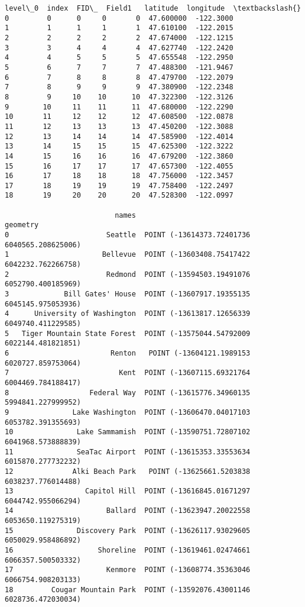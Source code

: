 \documentclass[11pt]{article}
\makeatletter
\newcommand{\boxspacing}{\kern\kvtcb@left@rule\kern\kvtcb@boxsep}
\newcommand{\prompt}[4]{
        {\ttfamily\llap{{\color{#2}[#3]:\hspace{3pt}#4}}\vspace{-\baselineskip}}
    }
\makeatother
\begin{document}
            \begin{tcolorbox}[breakable, size=fbox, boxrule=.5pt, pad at break*=1mm, opacityfill=0]
\prompt{Out}{outcolor}{161}{\boxspacing}
\begin{Verbatim}[commandchars=\\\{\}]
    level\_0  index  FID\_  Field1   latitude  longitude  \textbackslash{}
0         0      0     0       0  47.600000  -122.3000
1         1      1     1       1  47.610100  -122.2015
2         2      2     2       2  47.674000  -122.1215
3         3      4     4       4  47.627740  -122.2420
4         4      5     5       5  47.655548  -122.2950
5         6      7     7       7  47.488300  -121.9467
6         7      8     8       8  47.479700  -122.2079
7         8      9     9       9  47.380900  -122.2348
8         9     10    10      10  47.322300  -122.3126
9        10     11    11      11  47.680000  -122.2290
10       11     12    12      12  47.608500  -122.0878
11       12     13    13      13  47.450200  -122.3088
12       13     14    14      14  47.585900  -122.4014
13       14     15    15      15  47.625300  -122.3222
14       15     16    16      16  47.679200  -122.3860
15       16     17    17      17  47.657300  -122.4055
16       17     18    18      18  47.756000  -122.3457
17       18     19    19      19  47.758400  -122.2497
18       19     20    20      20  47.528300  -122.0997

                          names                                      geometry
0                       Seattle  POINT (-13614373.72401736 6040565.208625006)
1                      Bellevue  POINT (-13603408.75417422 6042232.762266758)
2                       Redmond  POINT (-13594503.19491076 6052790.400185969)
3             Bill Gates' House  POINT (-13607917.19355135 6045145.975053936)
4      University of Washington  POINT (-13613817.12656339 6049740.411229585)
5   Tiger Mountain State Forest  POINT (-13575044.54792009 6022144.481821851)
6                        Renton   POINT (-13604121.1989153 6020727.859753064)
7                          Kent  POINT (-13607115.69321764 6004469.784188417)
8                   Federal Way  POINT (-13615776.34960135 5994841.227999952)
9               Lake Washington  POINT (-13606470.04017103 6053782.391355693)
10               Lake Sammamish  POINT (-13590751.72807102 6041968.573888839)
11               SeaTac Airport  POINT (-13615353.33553634 6015870.277732232)
12              Alki Beach Park   POINT (-13625661.5203838 6038237.776014488)
13                 Capitol Hill  POINT (-13616845.01671297 6044742.955066294)
14                      Ballard  POINT (-13623947.20022558 6053650.119275319)
15               Discovery Park  POINT (-13626117.93029605 6050029.958486892)
16                    Shoreline  POINT (-13619461.02474661 6066357.500503332)
17                      Kenmore  POINT (-13608774.35363046 6066754.908203133)
18         Cougar Mountain Park  POINT (-13592076.43001146 6028736.472030034)
\end{Verbatim}
\end{tcolorbox}
        
\end{document}
